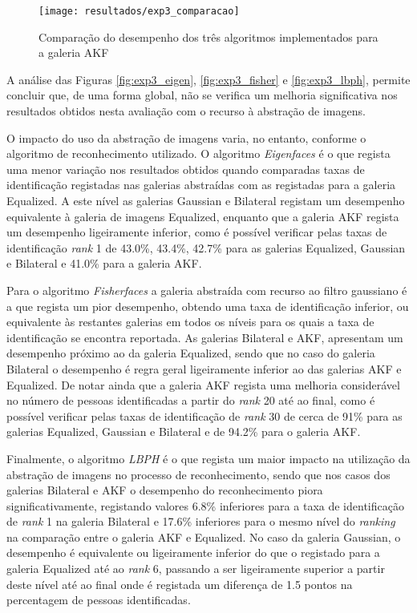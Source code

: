 \begin{figure}[ht]
  \begin{center}
    \leavevmode
    \texttt{[image: resultados/exp3\_comparacao]}
    \caption{Comparação do desempenho dos três algoritmos implementados para a galeria AKF}
    \label{fig:exp3_comaparacao}
  \end{center}
\end{figure}

A análise das Figuras \ref{fig:exp3_eigen}, \ref{fig:exp3_fisher} e \ref{fig:exp3_lbph}, permite concluir que, de uma forma global, não se verifica um melhoria significativa nos resultados obtidos nesta avaliação com o recurso à abstração de imagens. 

O impacto do uso da abstração de imagens varia, no entanto, conforme o algoritmo de reconhecimento utilizado. O algoritmo \textit{Eigenfaces} é o que regista uma menor variação nos resultados obtidos quando comparadas taxas de identificação registadas nas galerias abstraídas com as registadas para a galeria Equalized. A este nível as galerias Gaussian e Bilateral registam um desempenho equivalente à galeria de imagens Equalized, enquanto que a galeria AKF regista um desempenho ligeiramente inferior, como é possível verificar pelas taxas de identificação \textit{rank} 1 de 43.0\%, 43.4\%, 42.7\% para as galerias Equalized, Gaussian e Bilateral e 41.0\% para a galeria AKF.

Para o algoritmo \textit{Fisherfaces} a galeria abstraída com recurso ao filtro gaussiano é a que regista um pior desempenho, obtendo uma taxa de identificação inferior, ou equivalente às restantes galerias em todos os níveis para os quais a taxa de identificação se encontra reportada. As galerias Bilateral e AKF, apresentam um desempenho próximo ao da galeria Equalized, sendo que no caso do galeria Bilateral o desempenho é regra geral ligeiramente inferior ao das galerias AKF e Equalized. De notar ainda que a galeria AKF regista uma melhoria considerável no número de pessoas identificadas a partir do \textit{rank} 20 até ao final, como é possível verificar pelas taxas de identificação de \textit{rank} 30 de cerca de 91\% para as galerias Equalized, Gaussian e Bilateral e de 94.2\% para o galeria AKF.

Finalmente, o algoritmo \textit{LBPH} é o que regista um maior impacto na utilização da abstração de imagens no processo de reconhecimento, sendo que nos casos dos galerias Bilateral e AKF o desempenho do reconhecimento piora significativamente, registando valores 6.8\% inferiores para a taxa de identificação de \textit{rank} 1 na galeria Bilateral e 17.6\% inferiores para o mesmo nível do \textit{ranking} na comparação entre o galeria AKF e Equalized. No caso da galeria Gaussian, o desempenho é equivalente ou ligeiramente inferior do que o registado para a galeria Equalized até ao \textit{rank} 6, passando a ser ligeiramente superior a partir deste nível até ao final onde é registada um diferença de 1.5 pontos na percentagem de pessoas identificadas.

